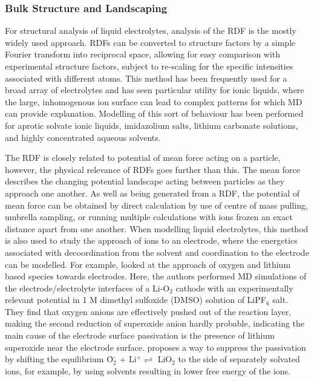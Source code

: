 \documentclass[../main.tex]{subfiles}
\begin{document}
\subsubsection{Bulk Structure and Landscaping}
For structural analysis of liquid electrolytes, analysis of the RDF is the mostly widely used approach. RDFs can be converted to structure factors by a simple Fourier transform into reciprocal space, allowing for easy comparison with experimental structure factors,\cite{shimizu_structural_2015, pethes_comparison_2017, hanke_intermolecular_2001,tsuzuki_molecular_2009} subject to re-scaling for the specific intensities associated with different atoms. This method has been frequently used for a broad array of electrolytes and has seen particular utility for ionic liquids, where the large, inhomogenous ion surface can lead to complex patterns for which MD can provide explanation. Modelling of this sort of behaviour has been performed for aprotic\cite{Migliorati_2015} solvate ionic liquids,\cite{shimizu_structural_2015} imidazolium salts,\cite{hanke_intermolecular_2001} lithium carbonate solutions,\cite{Chaudhari_2018} and highly concentrated aqueous solvents.\cite{pethes_comparison_2017}

The  RDF is closely related to potential of mean force acting on a particle, however, the physical relevance of RDFs goes further than this. The mean force describes the changing potential landscape acting between particles as they approach one another.\cite{frenkel_understanding_2002} As well as being generated from a RDF, the potential of mean force can be obtained by direct calculation by use of centre of mass pulling, umbrella sampling,\cite{lindahl_gromacs_2021} or running multiple calculations with ions frozen an exact distance apart from one another. When modelling liquid electrolytes, this method is also used to study the approach of ions to an electrode, where the energetics associated with decoordination from the solvent and coordination to the electrode can be modelled. For example, \citeauthor{sergeev_electrodeelectrolyte_2017} looked at the approach of oxygen and lithium based species towards electrodes.\cite{sergeev_electrodeelectrolyte_2017} Here, the authors performed MD simulations of the electrode/electrolyte interfaces of a Li-O$_2$ cathode with an experimentally relevant potential in 1 M dimethyl sulfoxide (DMSO) solution of LiPF$_6$ salt. They find that oxygen anions are effectively pushed out of the reaction layer, making the second reduction of superoxide anion hardly probable, indicating the main cause of the electrode surface passivation is the presence of lithium superoxide near the electrode surface. \citeauthor{sergeev_electrodeelectrolyte_2017} proposes a way to suppress the passivation by shifting the equilibrium \.{O}$_{2}^{\text{-}}$ + Li$^+ \rightleftharpoons$ LiO$_2$ to the side of separately solvated ions, for example, by using solvents resulting in lower free energy of the ions. \cite{sergeev_electrodeelectrolyte_2017}
\end{document}
